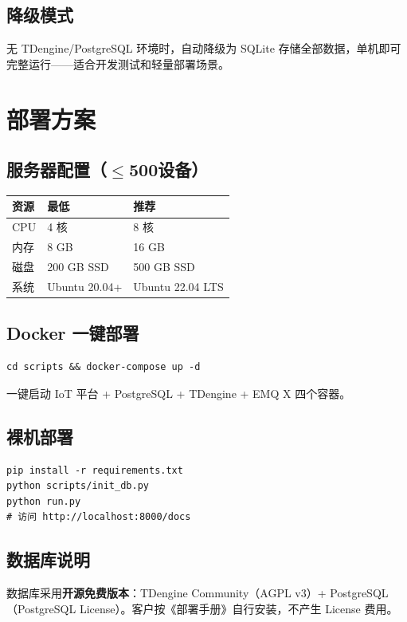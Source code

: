 \documentclass[12pt,a4paper]{ctexart}
\begin{document}
\subsection{降级模式}
无 TDengine/PostgreSQL 环境时，自动降级为 SQLite 存储全部数据，单机即可完整运行——适合开发测试和轻量部署场景。

\section{部署方案}

\subsection{服务器配置（$\leq$500设备）}

\begin{table}[H]\centering
\begin{tabular}{p{3cm}p{3cm}p{4cm}}
\toprule\textbf{资源} & \textbf{最低} & \textbf{推荐} \\
\midrule
CPU & 4 核 & 8 核 \\
内存 & 8 GB & 16 GB \\
磁盘 & 200 GB SSD & 500 GB SSD \\
系统 & Ubuntu 20.04+ & Ubuntu 22.04 LTS \\
\bottomrule
\end{tabular}
\end{table}

\subsection{Docker 一键部署}

\begin{verbatim}
cd scripts && docker-compose up -d
\end{verbatim}

一键启动 IoT 平台 + PostgreSQL + TDengine + EMQ X 四个容器。

\subsection{裸机部署}

\begin{verbatim}
pip install -r requirements.txt
python scripts/init_db.py
python run.py
# 访问 http://localhost:8000/docs
\end{verbatim}

\subsection{数据库说明}
数据库采用\textbf{开源免费版本}：TDengine Community（AGPL v3）+ PostgreSQL（PostgreSQL License）。客户按《部署手册》自行安装，不产生 License 费用。
\end{document}
